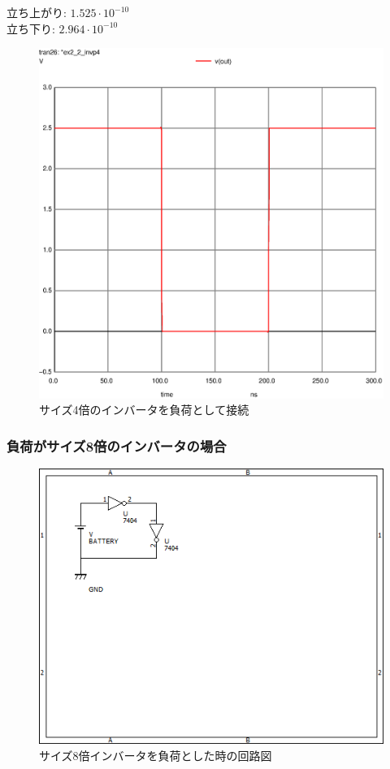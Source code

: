 \documentclass{jsarticle}
\begin{document}
\begin{flushleft}
    立ち上がり: $1.525 \cdot 10^{-10}$\\
    立ち下り: $2.964 \cdot 10^{-10}$
\end{flushleft}
\begin{figure}[H]
    \hspace{50pt}
    \includegraphics[scale=0.8]{ex2_2_invp4.ps}
    \vspace{30pt}
    \caption{サイズ4倍のインバータを負荷として接続}
\end{figure}

\subsubsection{負荷がサイズ8倍のインバータの場合}
\begin{figure}[H]
    \centering
    \includegraphics[bb=0 0 500 400]{ex2_2_inv.png}
    \caption{サイズ8倍インバータを負荷とした時の回路図}
\end{figure}
\end{document}
